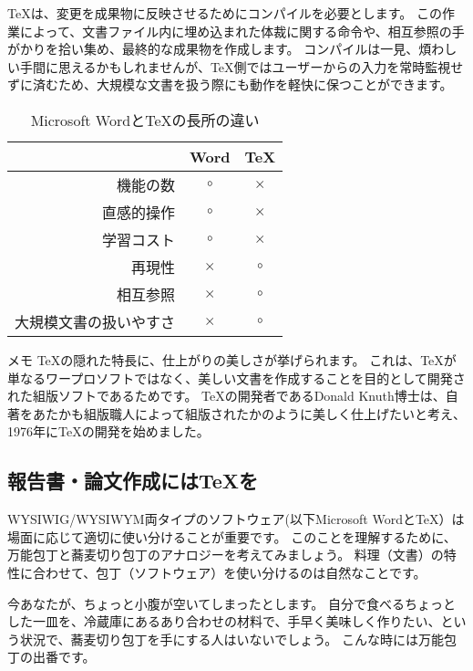 \documentclass[TeXworkshop]{subfiles}
\begin{document}
\TeX は、変更を成果物に反映させるためにコンパイルを必要とします。
この作業によって、文書ファイル内に埋め込まれた体裁に関する命令や、相互参照の手がかりを拾い集め、最終的な成果物を作成します。
コンパイルは一見、煩わしい手間に思えるかもしれませんが、\TeX 側ではユーザーからの入力を常時監視せずに済むため、大規模な文書を扱う際にも動作を軽快に保つことができます。

\begin{table}[h]
  \begin{center}
  \caption{Microsoft Wordと\TeX の長所の違い}
  \label{table:differences}
  \begin{tabular}{rcc}
                & Word & \TeX \\\hline
    機能の数              & $\circ$ & $\times$\\
    直感的操作            & $\circ$ & $\times$\\
    学習コスト            & $\circ$ & $\times$\\
    再現性                & $\times$ & $\circ$ \\
    相互参照              & $\times$ & $\circ$ \\
    大規模文書の扱いやすさ& $\times$ & $\circ$ \\\hline
  \end{tabular}
  \end{center}
\end{table}

\begin{itembox}[l]{メモ}
\TeX の隠れた特長に、仕上がりの美しさが挙げられます。
  これは、\TeX が単なるワープロソフトではなく、美しい文書を作成することを目的として開発された組版ソフトであるためです。
  \TeX の開発者であるDonald Knuth博士は、自著をあたかも組版職人によって組版されたかのように美しく仕上げたいと考え、1976年に\TeX の開発を始めました。
\end{itembox}

\subsection{報告書・論文作成には\TeX を}
WYSIWIG/WYSIWYM両タイプのソフトウェア(以下Microsoft Wordと\TeX）は場面に応じて適切に使い分けることが重要です。
このことを理解するために、万能包丁と蕎麦切り包丁のアナロジーを考えてみましょう。
料理（文書）の特性に合わせて、包丁（ソフトウェア）を使い分けるのは自然なことです。

今あなたが、ちょっと小腹が空いてしまったとします。
自分で食べるちょっとした一皿を、冷蔵庫にあるあり合わせの材料で、手早く美味しく作りたい、という状況で、蕎麦切り包丁を手にする人はいないでしょう。
こんな時には万能包丁の出番です。
\end{document}
